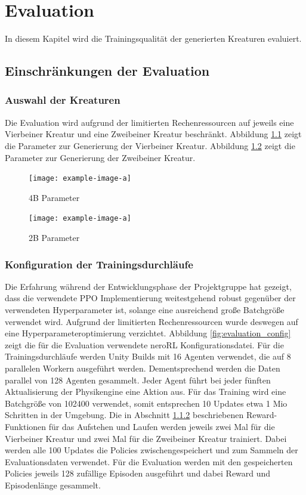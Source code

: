 \chapter{Evaluation}
\label{chap:evaluation}
In diesem Kapitel wird die Trainingsqualität der generierten Kreaturen evaluiert. 

\section{Einschränkungen der Evaluation}

\subsection{Auswahl der Kreaturen}
Die Evaluation wird aufgrund der limitierten Rechenressourcen auf jeweils eine Vierbeiner Kreatur und eine Zweibeiner Kreatur beschränkt. Abbildung \ref{fig:4B_creature_settings} zeigt die Parameter zur Generierung der Vierbeiner Kreatur. Abbildung \ref{fig:2B_creature_settings} zeigt die Parameter zur Generierung der Zweibeiner Kreatur.

\begin{figure}[ht]
    \centering
    \texttt{[image: example-image-a]}
    \caption{4B Parameter}\label{fig:4B_creature_settings}
\end{figure}

\begin{figure}[ht]
    \centering
    \texttt{[image: example-image-a]}
    \caption{2B Parameter}\label{fig:2B_creature_settings}
\end{figure}

\subsection{Konfiguration der Trainingsdurchläufe}
Die Erfahrung während der Entwicklungsphase der Projektgruppe hat gezeigt, dass die verwendete PPO Implementierung weitestgehend robust gegenüber der verwendeten Hyperparameter ist, solange eine ausreichend große Batchgröße verwendet wird. Aufgrund der limitierten Rechenressourcen wurde deswegen auf eine Hyperparameteroptimierung verzichtet. Abbildung \ref{fig:evaluation_config} zeigt die für die Evaluation verwendete neroRL Konfigurationsdatei. 
Für die Trainingsdurchläufe werden Unity Builds mit 16 Agenten verwendet, die auf 8 parallelen Workern ausgeführt werden. Dementsprechend werden die Daten parallel von 128 Agenten gesammelt. Jeder Agent führt bei jeder fünften Aktualisierung der Physikengine eine Aktion aus. Für das Training wird eine Batchgröße von 102400 verwendet, somit entsprechen 10 Updates etwa 1 Mio Schritten in der Umgebung.
Die in Abschnitt \ref{} beschriebenen Reward-Funktionen für das Aufstehen und Laufen werden jeweils zwei Mal für die Vierbeiner Kreatur und zwei Mal für die Zweibeiner Kreatur trainiert. Dabei werden alle 100 Updates die Policies zwischengespeichert und zum Sammeln der Evaluationsdaten verwendet. Für die Evaluation werden mit den gespeicherten Policies jeweils 128 zufällige Episoden ausgeführt und dabei Reward und Episodenlänge gesammelt.

